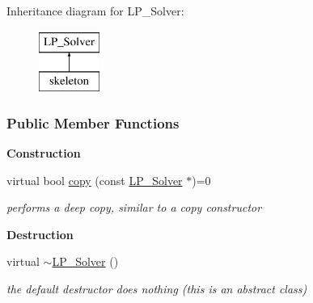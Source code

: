 Inheritance diagram for L\+P\+\_\+\+Solver\+:\begin{figure}[H]
\begin{center}
\leavevmode
\includegraphics[height=2.000000cm]{group___c_l_s_solvers}
\end{center}
\end{figure}
\subsubsection*{Public Member Functions}
\begin{Indent}\textbf{ Construction}\par
\begin{DoxyCompactItemize}
\item 
virtual bool \hyperlink{group___c_l_s_solvers_a442ad4ad67ee2feff0df49e9201d61ca}{copy} (const \hyperlink{group___c_l_s_solvers_class_l_p___solver}{L\+P\+\_\+\+Solver} $\ast$)=0
\begin{DoxyCompactList}\small\item\em performs a deep copy, similar to a copy constructor \end{DoxyCompactList}\end{DoxyCompactItemize}
\end{Indent}
\begin{Indent}\textbf{ Destruction}\par
\begin{DoxyCompactItemize}
\item 
\mbox{\label{group___c_l_s_solvers_a3cdeb4d133d147bae2c071bd41ed10aa}} 
virtual \hyperlink{group___c_l_s_solvers_a3cdeb4d133d147bae2c071bd41ed10aa}{$\sim$\+L\+P\+\_\+\+Solver} ()
\begin{DoxyCompactList}\small\item\em the default destructor does nothing (this is an abstract class) \end{DoxyCompactList}\end{DoxyCompactItemize}
\end{Indent}
